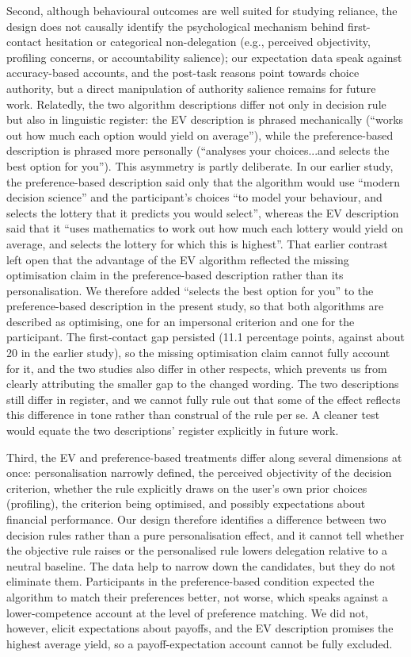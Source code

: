 \documentclass[a4paper, 12pt, fleqn]{article}
\theoremstyle{hypstyle}
\begin{document}
Second, although behavioural outcomes are well suited for studying reliance, the design does not causally identify the psychological mechanism behind first-contact hesitation or categorical non-delegation (e.g., perceived objectivity, profiling concerns, or accountability salience); our expectation data speak against accuracy-based accounts, and the post-task reasons point towards choice authority, but a direct manipulation of authority salience remains for future work. Relatedly, the two algorithm descriptions differ not only in decision rule but also in linguistic register: the EV description is phrased mechanically (``works out how much each option would yield on average''), while the preference-based description is phrased more personally (``analyses your choices...and selects the best option for you''). This asymmetry is partly deliberate. In our earlier study, the preference-based description said only that the algorithm would use ``modern decision science'' and the participant's choices ``to model your behaviour, and selects the lottery that it predicts you would select'', whereas the EV description said that it ``uses mathematics to work out how much each lottery would yield on average, and selects the lottery for which this is highest''. That earlier contrast left open that the advantage of the EV algorithm reflected the missing optimisation claim in the preference-based description rather than its personalisation. We therefore added ``selects the best option for you'' to the preference-based description in the present study, so that both algorithms are described as optimising, one for an impersonal criterion and one for the participant. The first-contact gap persisted (11.1 percentage points, against about 20 in the earlier study), so the missing optimisation claim cannot fully account for it, and the two studies also differ in other respects, which prevents us from clearly attributing the smaller gap to the changed wording. The two descriptions still differ in register, and we cannot fully rule out that some of the effect reflects this difference in tone rather than construal of the rule per se. A cleaner test would equate the two descriptions' register explicitly in future work.
	
Third, the EV and preference-based treatments differ along several dimensions at once: personalisation narrowly defined, the perceived objectivity of the decision criterion, whether the rule explicitly draws on the user's own prior choices (profiling), the criterion being optimised, and possibly expectations about financial performance. Our design therefore identifies a difference between two decision rules rather than a pure personalisation effect, and it cannot tell whether the objective rule raises or the personalised rule lowers delegation relative to a neutral baseline. The data help to narrow down the candidates, but they do not eliminate them. Participants in the preference-based condition expected the algorithm to match their preferences better, not worse, which speaks against a lower-competence account at the level of preference matching. We did not, however, elicit expectations about payoffs, and the EV description promises the highest average yield, so a payoff-expectation account cannot be fully excluded. 
\end{document}
